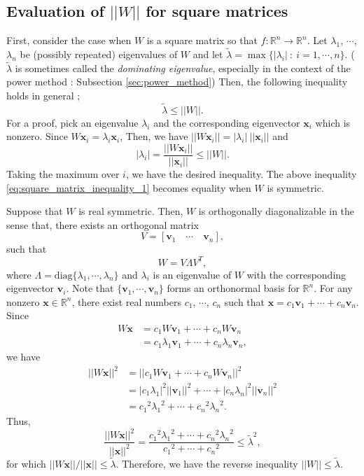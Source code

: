 \documentclass[12pt]{report}
\numberwithin{figure}{chapter}
\theoremstyle{plain}
\theoremstyle{definition}
\theoremstyle{corollary}
\theoremstyle{definition}
\theoremstyle{plain}
\theoremstyle{definition}
\theoremstyle{plain}
\newcommand\bx{\ensuremath{\boldsymbol x}}
\newcommand\bv{\ensuremath{\boldsymbol v}}
\begin{document}
%
\subsection{Evaluation of \(||W||\) for square matrices}

First, consider the case when \(W\) is a square matrix so that \(f:\mathbb R^n\to\mathbb R^n\).
Let \(\lambda_1\), \(\cdots\), \(\lambda_n\) be (possibly repeated) eigenvalues of \(W\) and let \(\tilde\lambda=\max\{|\lambda_i|\::\:i=1,\cdots,n\}\).
(\(\tilde\lambda\) is sometimes called the \emph{dominating eigenvalue}, especially in the context of the power method : Subsection \ref{sec:power_method})
Then, the following inequality holds in general ;
\begin{equation}\label{eq:square_matrix_inequality_1}
\tilde\lambda\le||W||.
\end{equation}
For a proof, pick an eigenvalue \(\lambda_i\) and the corresponding eigenvector \(\bx_i\) which is nonzero.
Since \(W\bx_i=\lambda_i\bx_i\),
Then, we have \(||W\bx_i||=|\lambda_i|\:||\bx_i||\) and
\[|\lambda_i|=\frac{||W\bx_i||}{||\bx_i||}\le||W||.\]
Taking the maximum over \(i\), we have the desired inequality.
The above inequality \eqref{eq:square_matrix_inequality_1} becomes equality when \(W\) is symmetric.

Suppose that \(W\) is real symmetric.
Then, \(W\) is orthogonally diagonalizable in the sense that, there exists an orthogonal matrix
\[V=[\bv_1\quad \cdots \quad \bv_n],\]
such that
\[W=V\Lambda V^T,\]
where \(\Lambda=\text{diag}\{\lambda_1,\cdots,\lambda_n\}\) and \(\lambda_i\) is an eigenvalue of \(W\) with the corresponding eigenvector \(\bv_i\).
Note that \(\{\bv_1,\cdots,\bv_n\}\) forms an orthonormal basis for \(\mathbb R^n\).
For any nonzero \(\bx\in\mathbb R^n\), there exist real numbers \(c_1\), \(\cdots\), \(c_n\) such that \(\bx=c_1\bv_1+\cdots+c_n\bv_n\).
Since
\begin{align*}
W\bx
&=c_1W\bv_1+\cdots+c_nW\bv_n\\
&=c_1\lambda_1\bv_1+\cdots+c_n\lambda_n\bv_n,
\end{align*}
we have
\begin{align*}
||W\bx||^2
&=||c_1W\bv_1+\cdots+c_nW\bv_n||^2\\
&=|c_1\lambda_1|^2||\bv_1||^2+\cdots+|c_n\lambda_n|^2||\bv_n||^2\\
&={c_1}^2{\lambda_1}^2+\cdots+{c_n}^2{\lambda_n}^2.
\end{align*}
Thus,
\[\frac{||W\bx||^2}{||\bx||^2}=\frac{{c_1}^2{\lambda_1}^2+\cdots+{c_n}^2{\lambda_n}^2}{{c_1}^2+\cdots+{c_n}^2}
\le{\tilde\lambda}^2,\]
for which \(||W\bx||/||\bx||\le\tilde\lambda\).
Therefore, we have the reverse inequality \(||W||\le\tilde\lambda\).
\end{document}
